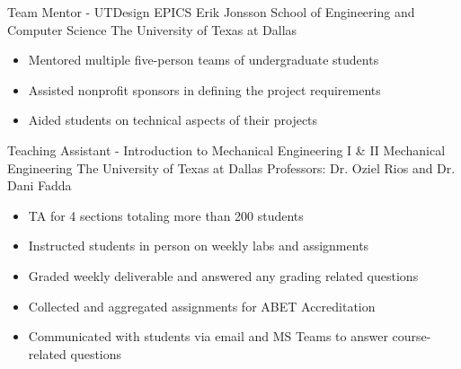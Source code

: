 \documentclass[11pt,letterpaper,roman]{moderncv} %
\begin{document}
{Team Mentor - UTDesign EPICS}
{Erik Jonsson School of Engineering and Computer Science}
{The University of Texas at Dallas}
{}
{\begin{itemize}
    \item Mentored multiple five-person teams of undergraduate students 
    \item Assisted nonprofit sponsors in defining the project requirements
    \item Aided students on technical aspects of their projects
\end{itemize}}

{Teaching Assistant - Introduction to Mechanical Engineering I \& II}
{Mechanical Engineering}
{The University of Texas at Dallas}
{Professors: Dr. Oziel Rios and Dr. Dani Fadda}
{\begin{itemize}
    \item TA for 4 sections totaling more than 200 students
    \item Instructed students in person on weekly labs and assignments
    \item Graded weekly deliverable and answered any grading related questions
    \item Collected and aggregated assignments for ABET Accreditation
    \item Communicated with students via email and MS Teams to answer course-related questions
\end{itemize}}

\end{document}
